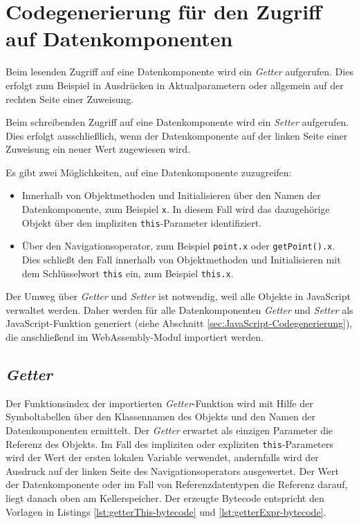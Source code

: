 

\section{Codegenerierung für den Zugriff auf Datenkomponenten}
\label{sec:Codegenerierung-für-den-Zugriff-auf-Datenkomponenten}

Beim lesenden Zugriff auf eine Datenkomponente wird ein \emph{Getter} aufgerufen. Dies erfolgt zum Beispiel in Ausdrücken in Aktualparametern oder allgemein auf der rechten Seite einer Zuweisung.

Beim schreibenden Zugriff auf eine Datenkomponente wird ein \emph{Setter} aufgerufen. Dies erfolgt ausschließlich, wenn der Datenkomponente auf der linken Seite einer Zuweisung ein neuer Wert zugewiesen wird.

Es gibt zwei Möglichkeiten, auf eine Datenkomponente zuzugreifen:
\begin{itemize}
    \item Innerhalb von Objektmethoden und Initialisieren über den Namen der Datenkomponente, zum Beispiel \lstinline{x}. In diesem Fall wird das dazugehörige Objekt über den impliziten \lstinline{this}-Parameter identifiziert.
    \item Über den Navigationsoperator, zum Beispiel \lstinline{point.x} oder \lstinline{getPoint().x}. Dies schließt den Fall innerhalb von Objektmethoden und Initialisieren mit dem Schlüsselwort \lstinline{this} ein, zum Beispiel \lstinline{this.x}.
\end{itemize}

Der Umweg über \emph{Getter} und \emph{Setter} ist notwendig, weil alle Objekte in JavaScript verwaltet werden. Daher werden für alle Datenkomponenten \emph{Getter} und \emph{Setter} als JavaScript-Funktion generiert (siehe Abschnitt \ref{sec:JavaScript-Codegenerierung}), die anschließend im WebAssembly-Modul importiert werden.

\subsection{\emph{Getter}}

Der Funktionsindex der importierten \emph{Getter}-Funktion wird mit Hilfe der Symboltabellen über den Klassennamen des Objekts und den Namen der Datenkomponenten ermittelt. Der \emph{Getter} erwartet als einzigen Parameter die Referenz des Objekts. Im Fall des impliziten oder expliziten \lstinline{this}-Parameters wird der Wert der ersten lokalen Variable verwendet, andernfalls wird der Ausdruck auf der linken Seite des Navigationsoperators ausgewertet. Der Wert der Datenkomponente oder im Fall von Referenzdatentypen die Referenz darauf, liegt danach oben am Kellerspeicher. Der erzeugte Bytecode entspricht den Vorlagen in Listings \ref{lst:getterThis-bytecode} und \ref{lst:getterExpr-bytecode}.

